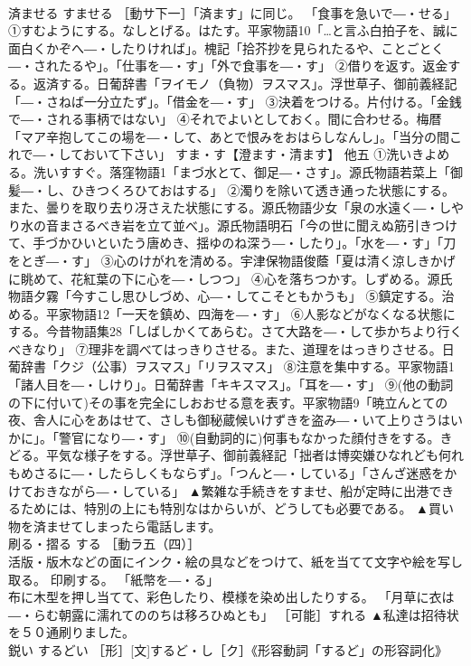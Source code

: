\documentclass[8pt]{extreport}
\begin{document}
\begin{CJK}{UTF8}{min}
\\	済ませる	すませる	［動サ下一］「済ます」に同じ。 「食事を急いで―・せる」 ①すむようにする。なしとげる。はたす。平家物語10「…と言ふ白拍子を、誠に面白くかぞへ―・したりければ」。槐記「拾芥抄を見られたるや、ことごとく―・されたるや」。「仕事を―・す」「外で食事を―・す」 ②借りを返す。返金する。返済する。日葡辞書「ヲイモノ（負物）ヲスマス」。浮世草子、御前義経記「―・さねば一分立たず」。「借金を―・す」 ③決着をつける。片付ける。「金銭で―・される事柄ではない」 ④それでよいとしておく。間に合わせる。梅暦「マア辛抱してこの場を―・して、あとで恨みをおはらしなんし」。「当分の間これで―・しておいて下さい」 すま・す【澄ます・清ます】 他五 ①洗いきよめる。洗いすすぐ。落窪物語1「まづ水とて、御足―・さす」。源氏物語若菜上「御髪―・し、ひきつくろひておはする」 ②濁りを除いて透き通った状態にする。また、曇りを取り去り冴さえた状態にする。源氏物語少女「泉の水遠く―・しやり水の音まさるべき岩を立て並べ」。源氏物語明石「今の世に聞えぬ筋引きつけて、手づかひいといたう唐めき、揺ゆのね深う―・したり」。「水を―・す」「刀をとぎ―・す」 ③心のけがれを清める。宇津保物語俊蔭「夏は清く涼しきかげに眺めて、花紅葉の下に心を―・しつつ」 ④心を落ちつかす。しずめる。源氏物語夕霧「今すこし思ひしづめ、心―・してこそともかうも」 ⑤鎮定する。治める。平家物語12「一天を鎮め、四海を―・す」 ⑥人影などがなくなる状態にする。今昔物語集28「しばしかくてあらむ。さて大路を―・して歩かちより行くべきなり」 ⑦理非を調べてはっきりさせる。また、道理をはっきりさせる。日葡辞書「クジ（公事）ヲスマス」「リヲスマス」 ⑧注意を集中する。平家物語1「諸人目を―・しけり」。日葡辞書「キキスマス」。「耳を―・す」 ⑨(他の動詞の下に付いて)その事を完全にしおおせる意を表す。平家物語9「暁立んとての夜、舎人に心をあはせて、さしも御秘蔵候いけずきを盗み―・いて上りさうはいかに」。「警官になり―・す」 ⑩(自動詞的に)何事もなかった顔付きをする。きどる。平気な様子をする。浮世草子、御前義経記「拙者は博奕嫌ひなれども何れもめさるに―・したらしくもならず」。「つんと―・している」「さんざ迷惑をかけておきながら―・している」	▲繁雑な手続きをすませ、船が定時に出港できるためには、特別の上にも特別なはからいが、どうしても必要である。 ▲買い物を済ませてしまったら電話します。
\\	刷る・摺る	する	［動ラ五（四）］ 
\\	活版・版木などの面にインク・絵の具などをつけて、紙を当てて文字や絵を写し取る。 印刷する。 「紙幣を―・る」 
\\	布に木型を押し当てて、彩色したり、模様を染め出したりする。 「月草に衣は―・らむ朝露に濡れてののちは移ろひぬとも」 ［可能］すれる	▲私達は招待状を５０通刷りました。
\\	鋭い	するどい	［形］[文]するど・し［ク］《形容動詞「するど」の形容詞化》 

\end{CJK}
\end{document}
